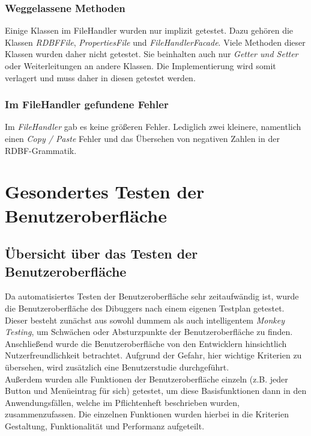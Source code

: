 \documentclass[parskip=full]{scrartcl}
\begin{document}
\subsubsection{Weggelassene Methoden}
Einige Klassen im FileHandler wurden nur implizit getestet. Dazu gehören die Klassen \textit{RDBFFile}, \textit{PropertiesFile} und \textit{FileHandlerFacade}.
Viele Methoden dieser Klassen wurden daher nicht getestet. Sie beinhalten auch nur \textit{Getter und Setter} oder Weiterleitungen an andere Klassen. Die Implementierung wird somit verlagert und muss daher in diesen getestet werden.

\subsubsection{Im FileHandler gefundene Fehler}
Im \textit{FileHandler} gab es keine größeren Fehler. Lediglich zwei kleinere, namentlich einen \textit{Copy / Paste} Fehler und das Übersehen von negativen Zahlen in der RDBF-Grammatik.

\newpage
\section{Gesondertes Testen der Benutzeroberfläche}\label{gui}

\subsection{Übersicht über das Testen der Benutzeroberfläche}
Da automatisiertes Testen der Benutzeroberfläche sehr zeitaufwändig ist, wurde die Benutzeroberfläche des Dibuggers nach einem eigenen Testplan getestet. Dieser besteht zunächst aus sowohl dummem als auch intelligentem \textit{Monkey Testing}, um Schwächen oder Absturzpunkte der Benutzeroberfläche zu finden. \\
Anschließend wurde die Benutzeroberfläche von den Entwicklern hinsichtlich Nutzerfreundlichkeit betrachtet. Aufgrund der Gefahr, hier wichtige Kriterien zu übersehen, wird zusätzlich eine Benutzerstudie durchgeführt. \\
Außerdem wurden alle Funktionen der Benutzeroberfläche einzeln (z.B. jeder Button und Menüeintrag für sich) getestet, um diese Basisfunktionen dann in den Anwendungsfällen, welche im Pflichtenheft beschrieben wurden, zusammenzufassen. Die einzelnen Funktionen wurden hierbei in die Kriterien Gestaltung, Funktionalität und Performanz aufgeteilt.
\end{document}
